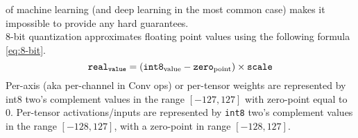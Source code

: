 of machine learning (and deep learning in the most common case) makes it
impossible to provide any hard guarantees.\cite{tflite-8bit}\\
8-bit quantization approximates floating point values using the following
formula \eqref{eq:8-bit}.
\begin{equation}
\label{eq:8-bit}
\text{\texttt{real}}_\text{\texttt{value}} = ({\text{\texttt{int8}}_\text{value}-\text{\texttt{zero}}_\text{point}}) \times \text{\texttt{scale}} 
\end{equation}
%
Per-axis (aka per-channel in Conv ops) or per-tensor weights are represented by
int8 two’s complement values in the range $[-127, 127]$ with zero-point equal to
0. Per-tensor activations/inputs are represented by \texttt{int8} two’s
complement values in the range $[-128, 127]$, with a zero-point in range $[-128,
127]$.
%
%
